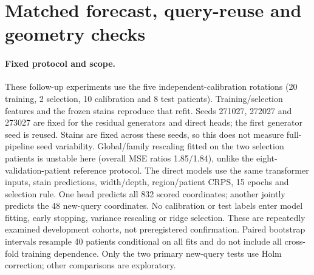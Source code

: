 \documentclass[10pt,letterpaper]{article}
\theoremstyle{definition}
\theoremstyle{remark}
\newcommand{\method}{\textnormal{\textsc{Ligature}}}
\begin{document}
\clearpage
\begin{table}[!htp]
\centering
\caption{ORION evaluation labels used throughout. Patient roles are training/validation/test for 24/8/8, and training/selection/calibration/test for 20/2/10/8. Runs (L/D) count \method{}/direct fits per rotation for the scored-statistic head; new-query direct heads are fitted separately. MSE is overall patient-level MSE relative to that evaluation's plug-in. Reseed variation is sample SD. The four-run aggregate combines the reference run with three reseeds; its paired direct comparison uses the direct reseed mean. Independent calibration and H\&E geometry are separate evaluations; H\&E geometry also changes the cell-proxy target.}
\label{tab:runregistry}

\end{table}

\section{Matched forecast, query-reuse and geometry checks}
\label{app:querybench}

\paragraph{Fixed protocol and scope.} These follow-up experiments use the five independent-calibration rotations (20 training, 2 selection, 10 calibration and 8 test patients). Training/selection features and the frozen stains reproduce that refit. Seeds 271027, 272027 and 273027 are fixed for the residual generators and direct heads; the first generator seed is reused. Stains are fixed across these seeds, so this does not measure full-pipeline seed variability. Global/family rescaling fitted on the two selection patients is unstable here (overall MSE ratios 1.85/1.84), unlike the eight-validation-patient reference protocol. The direct models use the same transformer inputs, stain predictions, width/depth, region/patient CRPS, 15 epochs and selection rule. One head predicts all 832 scored coordinates; another jointly predicts the 48 new-query coordinates. No calibration or test labels enter model fitting, early stopping, variance rescaling or ridge selection. These are repeatedly examined development cohorts, not preregistered confirmation. Paired bootstrap intervals resample 40 patients conditional on all fits and do not include all cross-fold training dependence. Only the two primary new-query tests use Holm correction; other comparisons are exploratory.
\end{document}
